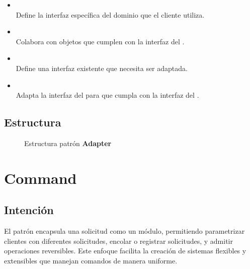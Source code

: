 
\begin{itemize}
\item \Objetivo\\
Define la interfaz específica del dominio que el cliente utiliza.
\item \Clientes\\
Colabora con objetos que cumplen con la interfaz del \Objetivo.
\item \Adaptable\\
Define una interfaz existente que necesita ser adaptada.
\item \Adaptador\\
Adapta la interfaz del \Adaptable para que cumpla con la interfaz del \Objetivo.
\end{itemize}

\subsection*{Estructura}

\begin{figure}[h]
\caption{Estructura patrón \textbf{Adapter}}
\begin{center}
\end{center}
\end{figure}


\section{Command}
\label{anexoCommand}


\subsection*{Intención}

El patrón encapsula una solicitud como un módulo, permitiendo parametrizar clientes con diferentes solicitudes, encolar o registrar solicitudes, y admitir operaciones reversibles. Este enfoque facilita la creación de sistemas flexibles y extensibles que manejan comandos de manera uniforme.

